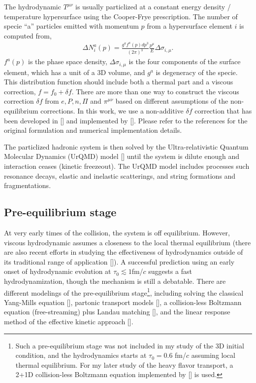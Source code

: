 The hydrodynamic $T^{\mu\nu}$ is usually particlized at a constant energy density / temperature hypersurface using the Cooper-Frye prescription.
The number of specie ``a'' particles emitted with momentum $p$ from a hypersurface element $i$ is computed from,
\begin{eqnarray}
\Delta N_i^a(p) = \frac{g^a f^a(p) dp^3}{(2\pi)^3}  \frac{p^{\mu}}{E} \Delta \sigma_{i,\mu}.
\end{eqnarray}
$f^a(p)$ is the phase space density, $\Delta \sigma_{i,\mu}$ is the four components of the surface element, which has a unit of a 3D volume, and $g^a$ is degeneracy of the specie.
This distribution function should include both a thermal part and a viscous correction, $f = f_0 + \delta f$.
There are more than one way to construct the viscous correction $\delta f$  from $e, P, n, \Pi$ and $\pi^{\mu\nu}$ based on different assumptions of the non-equilibrium corrections.
In this work, we use a non-additive $\delta f$ correction that has been developed in [] and implemented by [].
Please refer to the references for the original formulation and numerical implementation details.

The particlized hadronic system is then solved by the Ultra-relativistic Quantum Molecular Dynamics (UrQMD) model [] until the system is dilute enough and interaction ceases (kinetic freezeout). 
The UrQMD model includes processes such resonance decays, elastic and inelastic scatterings, and string formations and fragmentations.

\subsection{Pre-equilibrium stage}
At very early times of the collision, the system is off equilibrium. 
However, viscous hydrodynamic assumes a closeness to the local thermal equilibrium  (there are also recent efforts in studying the effectiveness of hydrodynamics outside of its traditional range of application []).
A successful prediction using an early onset of hydrodynamic evolution at $\tau_0\lesssim 1$fm/$c$ suggests a fast hydrodynamization, though the mechanism is still a debatable. 
There are different modelings of the pre-equilibrium stage\footnote{Such a pre-equilibrium stage was not included in my study of the 3D initial condition, and the hydrodynamics starts at $\tau_0 = 0.6$ fm/$c$ assuming local thermal equilibrium.
For my later study of the heavy flavor transport, a 2+1D collision-less Boltzmann equation implemented by [] is used.}, including solving the classical Yang-Mills equation [], partonic transport models [], a collision-less Boltzmann equation (free-streaming) plus Landau matching [], and the linear response method of the effective kinetic approach [].

